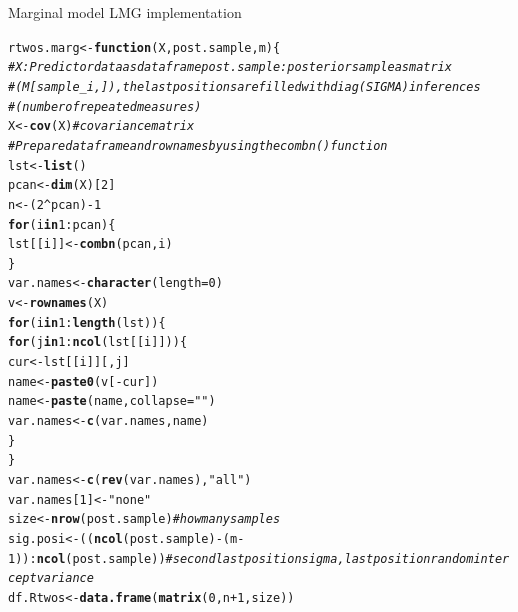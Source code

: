 \documentclass[11pt,a4paper,twoside]{book}\usepackage[]{graphicx}\usepackage[]{color}
\makeatletter
\newcommand{\hlnum}[1]{\textcolor[rgb]{0.686,0.059,0.569}{#1}}%
\newcommand{\hlstr}[1]{\textcolor[rgb]{0.192,0.494,0.8}{#1}}%
\newcommand{\hlcom}[1]{\textcolor[rgb]{0.678,0.584,0.686}{\textit{#1}}}%
\newcommand{\hlopt}[1]{\textcolor[rgb]{0,0,0}{#1}}%
\newcommand{\hlstd}[1]{\textcolor[rgb]{0.345,0.345,0.345}{#1}}%
\newcommand{\hlkwa}[1]{\textcolor[rgb]{0.161,0.373,0.58}{\textbf{#1}}}%
\newcommand{\hlkwb}[1]{\textcolor[rgb]{0.69,0.353,0.396}{#1}}%
\newcommand{\hlkwc}[1]{\textcolor[rgb]{0.333,0.667,0.333}{#1}}%
\newcommand{\hlkwd}[1]{\textcolor[rgb]{0.737,0.353,0.396}{\textbf{#1}}}%
\newenvironment{kframe}{%
 \def\at@end@of@kframe{}%
 \ifinner\ifhmode%
  \def\at@end@of@kframe{\end{minipage}}%
  \begin{minipage}{\columnwidth}%
 \fi\fi%
 \def\FrameCommand##1{\hskip\@totalleftmargin \hskip-\fboxsep
 \colorbox{shadecolor}{##1}\hskip-\fboxsep
     \hskip-\linewidth \hskip-\@totalleftmargin \hskip\columnwidth}%
 \MakeFramed {\advance\hsize-\width
   \@totalleftmargin\z@ \linewidth\hsize
   \@setminipage}}%
 {\par\unskip\endMakeFramed%
 \at@end@of@kframe}
\newenvironment{knitrout}{}{} %
\makeatother
\begin{document}
		\begin{codeenv}
		
\caption{Marginal model LMG implementation}\label{r04:LMG.rmarg}
\begin{knitrout}
\color{fgcolor}\begin{kframe}
\begin{alltt}
\hlstd{rtwos.marg} \hlkwb{<-} \hlkwa{function}\hlstd{(}\hlkwc{X}\hlstd{,} \hlkwc{post.sample}\hlstd{,} \hlkwc{m}\hlstd{) \{}
    \hlcom{# X: Predictor data as data frame post.sample: posterior sample as matrix}
    \hlcom{# (M[sample_i,]), the last positions are filled with diag(SIGMA) inferences}
    \hlcom{# (number of repeated measures)}
    \hlstd{X} \hlkwb{<-} \hlkwd{cov}\hlstd{(X)}  \hlcom{#covariance matrix}
    \hlcom{# Prepare data frame and rownames by using the combn() function}
    \hlstd{lst} \hlkwb{<-} \hlkwd{list}\hlstd{()}
    \hlstd{pcan} \hlkwb{<-} \hlkwd{dim}\hlstd{(X)[}\hlnum{2}\hlstd{]}
    \hlstd{n} \hlkwb{<-} \hlstd{(}\hlnum{2}\hlopt{^}\hlstd{pcan)} \hlopt{-} \hlnum{1}
    \hlkwa{for} \hlstd{(i} \hlkwa{in} \hlnum{1}\hlopt{:}\hlstd{pcan) \{}
        \hlstd{lst[[i]]} \hlkwb{<-} \hlkwd{combn}\hlstd{(pcan, i)}
    \hlstd{\}}
    \hlstd{var.names} \hlkwb{<-} \hlkwd{character}\hlstd{(}\hlkwc{length} \hlstd{=} \hlnum{0}\hlstd{)}
    \hlstd{v} \hlkwb{<-} \hlkwd{rownames}\hlstd{(X)}
    \hlkwa{for} \hlstd{(i} \hlkwa{in} \hlnum{1}\hlopt{:}\hlkwd{length}\hlstd{(lst)) \{}
        \hlkwa{for} \hlstd{(j} \hlkwa{in} \hlnum{1}\hlopt{:}\hlkwd{ncol}\hlstd{(lst[[i]])) \{}
            \hlstd{cur} \hlkwb{<-} \hlstd{lst[[i]][, j]}
            \hlstd{name} \hlkwb{<-} \hlkwd{paste0}\hlstd{(v[}\hlopt{-}\hlstd{cur])}
            \hlstd{name} \hlkwb{<-} \hlkwd{paste}\hlstd{(name,} \hlkwc{collapse} \hlstd{=} \hlstr{" "}\hlstd{)}
            \hlstd{var.names} \hlkwb{<-} \hlkwd{c}\hlstd{(var.names, name)}
        \hlstd{\}}
    \hlstd{\}}
    \hlstd{var.names} \hlkwb{<-} \hlkwd{c}\hlstd{(}\hlkwd{rev}\hlstd{(var.names),} \hlstr{"all"}\hlstd{)}
    \hlstd{var.names[}\hlnum{1}\hlstd{]} \hlkwb{<-} \hlstr{"none"}
    \hlstd{size} \hlkwb{<-} \hlkwd{nrow}\hlstd{(post.sample)}  \hlcom{# how many samples}
    \hlstd{sig.posi} \hlkwb{<-} \hlstd{((}\hlkwd{ncol}\hlstd{(post.sample)} \hlopt{-} \hlstd{(m} \hlopt{-} \hlnum{1}\hlstd{))}\hlopt{:}\hlkwd{ncol}\hlstd{(post.sample))}  \hlcom{# second last position sigma, last position random intercept variance}
    \hlstd{df.Rtwos} \hlkwb{<-} \hlkwd{data.frame}\hlstd{(}\hlkwd{matrix}\hlstd{(}\hlnum{0}\hlstd{, n} \hlopt{+} \hlnum{1}\hlstd{, size))}

\end{alltt}
\end{kframe}
\end{knitrout}
\end{codeenv}
\end{document}
